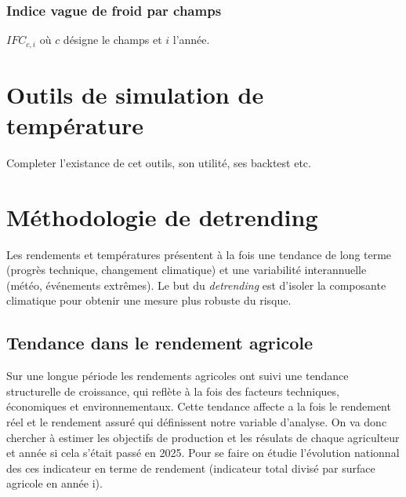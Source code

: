 \documentclass[11pt,a4paper,openright,twoside]{report}
\begin{document}
\subsubsection{Indice vague de froid par champs}
$IFC_{c,i}$ où $c$ désigne le champs et $i$ l'année.

\section{Outils de simulation de température}
Completer l'existance de cet outils, son utilité, ses backtest etc.

\section{Méthodologie de detrending}
Les rendements et températures présentent à la fois une tendance de long terme (progrès technique, changement climatique) et une variabilité interannuelle (météo, événements extrêmes). Le but du \textit{detrending} est d’isoler la composante climatique pour obtenir une mesure plus robuste du risque.  

\subsection{Tendance dans le rendement agricole}
Sur une longue période les rendements agricoles ont suivi une tendance structurelle de croissance, qui reflète à la fois des facteurs techniques, économiques et environnementaux. 
Cette tendance affecte a la fois le rendement réel et le rendement assuré qui définissent notre variable d'analyse. On va donc chercher à estimer les objectifs de production et les résulats de chaque agriculteur et année si cela s'était passé en 2025. 
Pour se faire on étudie l'évolution nationnal des ces indicateur en terme de rendement (indicateur total divisé par surface agricole en année i).
\end{document}
